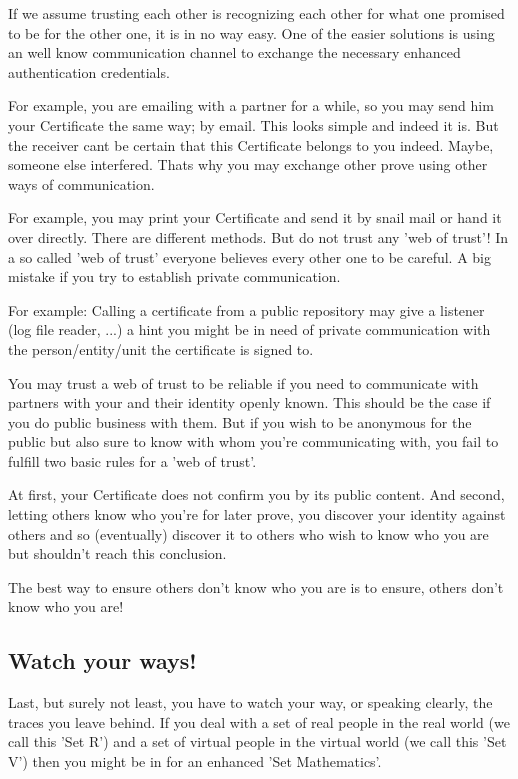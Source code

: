 \documentclass[twoside,a4paper,english,12pt,authoryear,openright]{book}
\begin{document}
If we assume trusting each other is recognizing each other for what one promised to be for the other one, it is in no way easy. One of the easier solutions is using an well know communication channel to exchange the necessary enhanced authentication credentials.

For example, you are emailing with a partner for a while, so you may send him your Certificate the same way; by email. This looks simple and indeed it is. But the receiver cant be certain that this Certificate belongs to you indeed. Maybe, someone else interfered. Thats why you may exchange other prove using other ways of communication.

For example, you may print your Certificate and send it by snail mail or hand it over directly. There are different methods. But do not trust any 'web of trust'! In a so called 'web of trust' everyone believes every other one to be careful. A big mistake if you try to establish private communication.

For example: Calling a certificate from a public repository may give a listener (log file reader, ...) a hint you might be in need of private communication with the person/entity/unit the certificate is signed to.

You may trust a web of trust to be reliable if you need to communicate with partners with your and their identity openly known. This should be the case if you do public business with them. But if you wish to be anonymous for the public but also sure to know with whom you're communicating with, you fail to fulfill two basic rules for a 'web of trust'.

At first, your Certificate does not confirm you by its public content. And second, letting others know who you're for later prove, you discover your identity against others and so (eventually) discover it to others who wish to know who you are but shouldn't reach this conclusion.

The best way to ensure others don't know who you are is to ensure, others don't know who you are!

\subsection{Watch your ways!}

Last, but surely not least, you have to watch your way, or speaking clearly, the traces you leave behind. If you deal with a set of real people in the real world (we call this 'Set R')  and a set of virtual people in the virtual world (we call this 'Set V') then you might be in for an enhanced 'Set Mathematics'.
\end{document}
